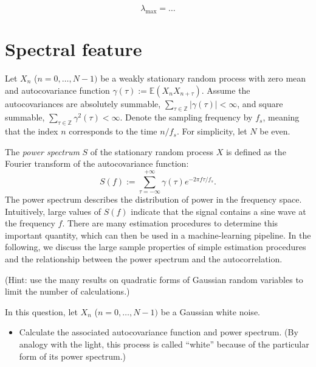 \documentclass[11pt]{article}
\begin{document}
\begin{solution}  %

\begin{equation}
    \lambda_{\max} = \dots
\end{equation}

\end{solution}

\section{Spectral feature}

Let $X_n$ ($n=0,\dots, N-1)$ be a weakly stationary random process with zero mean and autocovariance function $\gamma(\tau):= \mathbb{E}(X_n X_{n+\tau})$.
Assume the autocovariances are absolutely summable, \ie $\sum_{\tau\in\mathbb{Z}} |\gamma(\tau)| < \infty$, and square summable, \ie $\sum_{\tau\in\mathbb{Z}} \gamma^2(\tau) < \infty$.
Denote the sampling frequency by $f_s$, meaning that the index $n$ corresponds to the time $n / f_s$. For simplicity, let $N$ be even.


The \textit{power spectrum} $S$ of the stationary random process $X$ is defined as the Fourier transform of the autocovariance function:
\begin{equation}
    S(f) := \sum_{\tau=-\infty}^{+\infty}\gamma(\tau)e^{-2\pi f\tau/f_s}.
\end{equation}
The power spectrum describes the distribution of power in the frequency space. 
Intuitively, large values of $S(f)$ indicate that the signal contains a sine wave at the frequency $f$.
There are many estimation procedures to determine this important quantity, which can then be used in a machine-learning pipeline.
In the following, we discuss the large sample properties of simple estimation procedures and the relationship between the power spectrum and the autocorrelation.

(Hint: use the many results on quadratic forms of Gaussian random variables to limit the number of calculations.)

\begin{exercise}
In this question, let $X_n$ ($n=0,\dots,N-1)$ be a Gaussian white noise.

\begin{itemize}
    \item Calculate the associated autocovariance function and power spectrum. (By analogy with the light, this process is called ``white'' because of the particular form of its power spectrum.)
\end{itemize}

\end{exercise}
\end{document}
